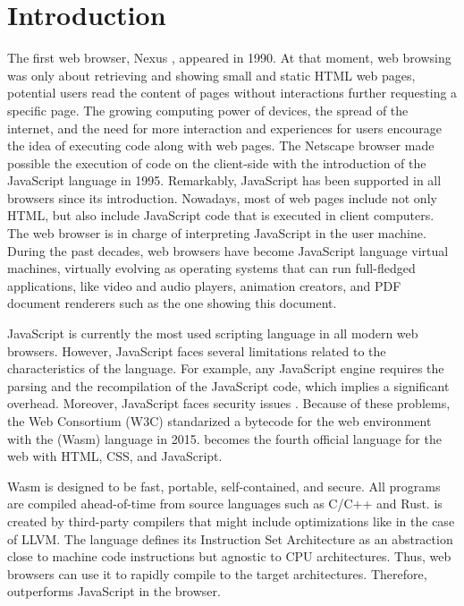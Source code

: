 \chapter{Introduction}
\label{chapter:intro}


The first web browser, Nexus \cite{nexus}, appeared in 1990.
At that moment, web browsing was only about retrieving and showing small and static HTML web pages, \ie potential users read the content of pages without interactions further requesting a specific page.
The growing computing power of devices, the spread of the internet, and the need for more interaction and experiences for users encourage the idea of executing code along with web pages.
The Netscape browser made possible the execution of code on the client-side with the introduction of the JavaScript language in 1995.
Remarkably, JavaScript has been supported in all browsers since its introduction.
Nowadays, most of web pages include not only HTML, but also include JavaScript code that is executed in client computers.
The web browser is in charge of interpreting JavaScript in the user machine.
During the past decades, web browsers have become JavaScript language virtual machines, virtually evolving as operating systems that can run full-fledged applications, like video and audio players, animation creators, and PDF document renderers such as the one showing this document.

JavaScript is currently the most used scripting language in all modern web browsers. 
However, JavaScript faces several limitations related to the characteristics of the language. For example, any JavaScript engine requires the parsing and the recompilation of the JavaScript code, which implies a significant overhead.
Moreover, JavaScript faces security issues \cite{10.1145/1190216.1190252}.
Because of these problems, the Web Consortium (W3C) standarized a bytecode for the web environment with the \wasm (Wasm) language in 2015. 
\wasm becomes the fourth official language for the web with HTML, CSS, and JavaScript.

Wasm is designed to be fast, portable, self-contained, and secure.
All \wasm programs are compiled ahead-of-time from source languages such as C/C++ and Rust.
\wasm is created by third-party compilers that might include optimizations like in the case of LLVM.  
The \wasm language defines its Instruction Set Architecture \cite{wasm_spec} as an abstraction close to machine code instructions but agnostic to CPU architectures. Thus,  web browsers can use it to rapidly compile to the target architectures. Therefore, \wasm outperforms JavaScript in the browser.


